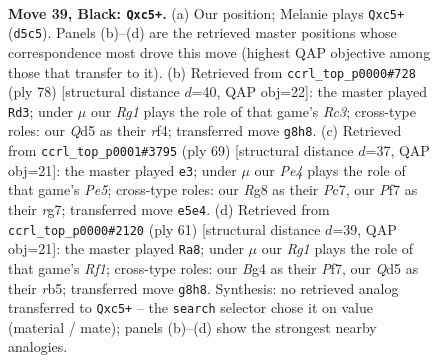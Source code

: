 \documentclass[11pt]{article}
\begin{document}
\clearpage

\begin{figure}[p]\centering
\begin{subfigure}{0.46\textwidth}\centering
\resizebox{\linewidth}{!}{%
\newchessgame
\chessboard[
  setfen={5kr1/p4p2/7p/2Pqp1p1/P5b1/8/2K5/8 b - - 0 39},
  showmover=false,
  pgfstyle=straightmove, color=movearrow, markmove={d5-c5}
]}
\caption{}
\end{subfigure}\hfill
\begin{subfigure}{0.46\textwidth}\centering
\resizebox{\linewidth}{!}{%
\newchessgame
\chessboard[
  setfen={8/4k1p1/p6p/8/2P2r2/PKR2P2/7P/8 w - - 7 40},
  showmover=false,
  pgfstyle=straightmove, color=movearrow, markmove={c3-d3}
]}
\caption{}
\end{subfigure}
\\[4pt]
\begin{subfigure}{0.46\textwidth}\centering
\resizebox{\linewidth}{!}{%
\newchessgame
\chessboard[
  setfen={2k5/1pp3R1/p7/7P/P1Prp3/7K/8/8 b - - 0 35},
  showmover=false,
  pgfstyle=straightmove, color=movearrow, markmove={e4-e3}
]}
\caption{}
\end{subfigure}\hfill
\begin{subfigure}{0.46\textwidth}\centering
\resizebox{\linewidth}{!}{%
\newchessgame
\chessboard[
  setfen={5rk1/5pp1/7p/1R6/1p4P1/8/PP3P2/6K1 b - - 1 31},
  showmover=false,
  pgfstyle=straightmove, color=movearrow, markmove={f8-a8}
]}
\caption{}
\end{subfigure}
\caption{\textbf{Move 39, Black: \texttt{Qxc5+}.} (a) Our position; Melanie plays \texttt{Qxc5+} (\texttt{d5c5}). Panels (b)--(d) are the retrieved master positions whose correspondence most drove this move (highest QAP objective among those that transfer to it). (b) Retrieved from \texttt{ccrl\_top\_p0000\#728} (ply 78) [structural distance $d$=40, QAP obj=22]: the master played \texttt{Rd3}; under $\mu$ our \emph{Rg1} plays the role of that game's \emph{Rc3}; cross-type roles: our \emph{Q}d5 as their \emph{r}f4; transferred move \texttt{g8h8}. (c) Retrieved from \texttt{ccrl\_top\_p0001\#3795} (ply 69) [structural distance $d$=37, QAP obj=21]: the master played \texttt{e3}; under $\mu$ our \emph{Pe4} plays the role of that game's \emph{Pe5}; cross-type roles: our \emph{R}g8 as their \emph{P}c7, our \emph{P}f7 as their \emph{r}g7; transferred move \texttt{e5e4}. (d) Retrieved from \texttt{ccrl\_top\_p0000\#2120} (ply 61) [structural distance $d$=39, QAP obj=21]: the master played \texttt{Ra8}; under $\mu$ our \emph{Rg1} plays the role of that game's \emph{Rf1}; cross-type roles: our \emph{B}g4 as their \emph{P}f7, our \emph{Q}d5 as their \emph{r}b5; transferred move \texttt{g8h8}. Synthesis: no retrieved analog transferred to \texttt{Qxc5+} -- the \texttt{search} selector chose it on value (material / mate); panels (b)--(d) show the strongest nearby analogies.}
\label{fig:thought-m77}
\end{figure}
\end{document}
